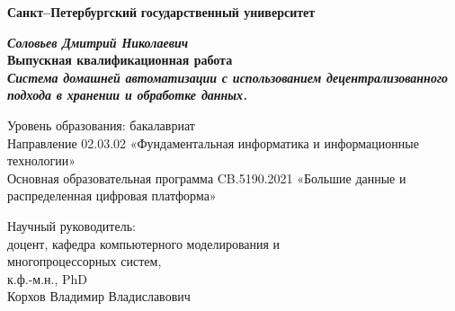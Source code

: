 
\begin{titlepage}
\begin{center}

\textbf{Санкт--Петербургский}
\textbf{государственный университет}

\vspace{35mm}

\textbf{\textit{\large Соловьев Дмитрий Николаевич}} \\[8mm]
\textbf{\large Выпускная квалификационная работа}\\[3mm]
\textbf{\textit{\large Система домашней автоматизации с использованием децентрализованного подхода в хранении и обработке данных.}}

\vspace{20mm}
Уровень образования: бакалавриат\\
Направление 02.03.02  «Фундаментальная информатика и информационные технологии»\\
Основная образовательная программа CB.5190.2021
«Большие данные и распределенная цифровая платформа»\\[25mm]


\begin{flushright}
\begin{minipage}[t]{0.65\textwidth}
{Научный руководитель:} \\
доцент, кафедра компьютерного моделирования и \\многопроцессорных систем,\\к.ф.-м.н., PhD\\Корхов Владимир Владиславович


\end{minipage}
\end{flushright}
\end{center}
\end{titlepage}
